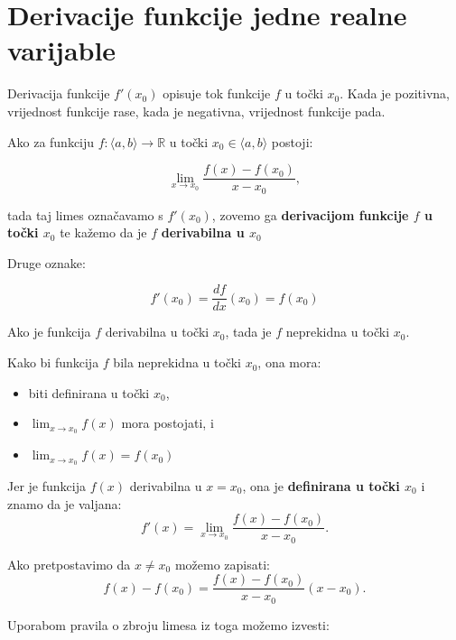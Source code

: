 \section{Derivacije funkcije jedne realne varijable}

Derivacija funkcije $f'(x_0)$ opisuje tok funkcije $f$ u točki $x_0$. Kada je
pozitivna, vrijednost funkcije rase, kada je negativna, vrijednost funkcije pada.

\begin{definitionbox}
    Ako za funkciju $f:\langle a,b\rangle \to \mathbb{R}$ u točki $x_0\in\langle a,b\rangle$ postoji:

    \begin{equation}
        \label{eq:diff}
        \tag{derivacija funkcije}
        \lim_{x\to x_0} \frac{f(x) - f(x_0)}{x-x_0},
    \end{equation}

    tada taj limes označavamo s $f'(x_0)$, zovemo ga \textbf{derivacijom funkcije $f$ u točki $x_0$}
    te kažemo da je $f$ \textbf{derivabilna u $x_0$}
\end{definitionbox}

Druge oznake:

$$
f'(x_0) = \frac{df}{dx}(x_0) = f(x_0)
$$

\begin{propositionbox}
    Ako je funkcija $f$ derivabilna u točki $x_0$, tada je $f$ neprekidna u točki $x_0$.
\end{propositionbox}

Kako bi funkcija $f$ bila neprekidna u točki $x_0$, ona mora:
\begin{itemize}
    \item biti definirana u točki $x_0$,
    \item $\lim_{x\to x_0}f(x)$ mora postojati, i
    \item $\lim_{x\to x_0}f(x) = f(x_0)$
\end{itemize}

Jer je funkcija $f(x)$ derivabilna u $x=x_0$, ona je \textbf{definirana u točki $x_0$} i znamo da je  valjana:
$$
f'(x) = \lim_{x\to x_0} \frac{f(x) - f(x_0)}{x-x_0}.
$$

Ako pretpostavimo da $x\neq x_0$ možemo zapisati:
$$
f(x) - f(x_0) = \frac{f(x)-f(x_0)}{x-x_0}(x-x_0).
$$

Uporabom pravila o zbroju limesa iz toga možemo izvesti:

